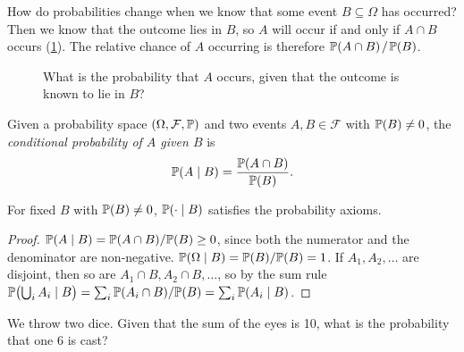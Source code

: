 How do probabilities change when we know that some event $B \subseteq \Omega$ has occurred? Then we know that the outcome lies in $B$, so $A$ will occur if and only if $A \cap B$ occurs (\cref{fig:conditional-probability}). The relative chance of $A$ occurring is therefore $\mathbb{P}(A \cap B) \mkern2mu / \mkern2mu \mathbb{P}(B)$.

\begin{figure}[H]
\centering
{}
\caption{What is the probability that $A$ occurs, given that the outcome is known to lie in $B$?}
\label{fig:conditional-probability}
\end{figure}

\begin{definition}\label{def:conditional-probability}
Given a probability space $(\Omega, \mathcal{F}, \mathbb{P})$ and two events $A, B \in \mathcal{F}$ with $\mathbb{P}(B) \ne 0$, the \emph{conditional probability of $A$ given $B$} is
\begin{equation}\label{eq:conditional-probability}
  \mathbb{P}(A \mid B) = \frac{\mathbb{P}(A \cap B)}{\mathbb{P}(B)}.
\end{equation}
\end{definition}

\begin{proposition}\label{prop:conditional-probability-is-probability}
For fixed $B$ with $\mathbb{P}(B) \ne 0$, $\mathbb{P}(\cdot \mid B)$ satisfies the probability axioms.
\end{proposition}

\begin{proof}
$\mathbb{P}(A \mid B) = \mathbb{P}(A \cap B)/\mathbb{P}(B) \ge 0$, since both the numerator and the denominator are non-negative. $\mathbb{P}(\Omega \mid B) = \mathbb{P}(B)/\mathbb{P}(B) = 1$. If $A_1, A_2, \ldots$ are disjoint, then so are $A_1 \cap B, A_2 \cap B, \ldots$, so by the sum rule $\mathbb{P}\bigl(\bigcup_i A_i \mid B\bigr) = \sum_i \mathbb{P}(A_i \cap B)/\mathbb{P}(B) = \sum_i \mathbb{P}(A_i \mid B)$.
\end{proof}

\begin{example}\label{ex:two-dice-conditional}
We throw two dice. Given that the sum of the eyes is 10, what is the probability that one 6 is cast?
\end{example}

